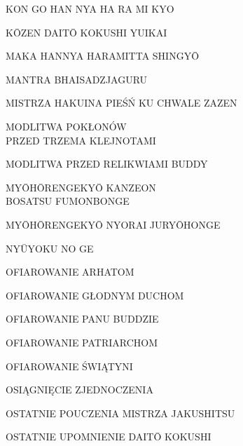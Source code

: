 \par\noindent KON GO HAN NYA HA RA MI KYO \dotfill \makebox[1.0cm][r]{\pageref{kon_go_han_nya_ha_ra_mi_kyo}}
\par\noindent K\=OZEN DAIT\=O KOKUSHI YUIKAI \dotfill \makebox[1.0cm][r]{\pageref{kozen_daito_kokushi_yuikai}}
\par\noindent MAKA HANNYA HARAMITTA SHINGY\=O \dotfill \makebox[1.0cm][r]{\pageref{hannya_shin_gyo}}
\par\noindent MANTRA BHAISADZJAGURU \dotfill \makebox[1.0cm][r]{\pageref{mantra_bhaisadzjaguru}}
\par\noindent MISTRZA HAKUINA PIEŚŃ KU CHWALE ZAZEN \dotfill \makebox[1.0cm][r]{\pageref{mistrza_hakuina_piesn}}
\par\noindent MODLITWA POKŁONÓW\\ PRZED TRZEMA KLEJNOTAMI \dotfill \makebox[1.0cm][r]{\pageref{trzy_skarby}}
\par\noindent MODLITWA PRZED RELIKWIAMI BUDDY \dotfill \makebox[1.0cm][r]{\pageref{przed_relikwiami}}
\par\noindent MY\=OH\=ORENGEKY\=O KANZEON\\ BOSATSU FUMONBONGE \dotfill \makebox[1.0cm][r]{\pageref{myohorengekyo_kanzeonbosatsu_fumonbonge}}
\par\noindent MY\=OH\=ORENGEKY\=O NYORAI JURY\=OHONGE \dotfill \makebox[1.0cm][r]{\pageref{myohorengekyo_nyorai_juryohonge}}
\par\noindent NY\=UYOKU NO GE \dotfill \makebox[1.0cm][r]{\pageref{nyuyoku_no_ge}}
\par\noindent OFIAROWANIE ARHATOM \dotfill \makebox[1.0cm][r]{\pageref{ofiarowanie_arhatom}}
\par\noindent OFIAROWANIE GŁODNYM DUCHOM \dotfill \makebox[1.0cm][r]{\pageref{ofiarowanie_glodnym_duchom}}
\par\noindent OFIAROWANIE PANU BUDDZIE \dotfill \makebox[1.0cm][r]{\pageref{ofiarowanie_panu_buddzie}}
\par\noindent OFIAROWANIE PATRIARCHOM \dotfill \makebox[1.0cm][r]{\pageref{ofiarowanie_patriarchom}}
\par\noindent OFIAROWANIE ŚWIĄTYNI \dotfill \makebox[1.0cm][r]{\pageref{ofiarowanie_swiatyni}}
\par\noindent OSIĄGNIĘCIE ZJEDNOCZENIA \dotfill \makebox[1.0cm][r]{\pageref{osiagniecie_zjednoczenia}}
\par\noindent OSTATNIE POUCZENIA MISTRZA JAKUSHITSU \dotfill \makebox[1.0cm][r]{\pageref{ostatnie_pouczenia_mistrza_jakushitsu}}
\par\noindent OSTATNIE UPOMNIENIE DAIT\=O KOKUSHI \dotfill \makebox[1.0cm][r]{\pageref{ostatnie_upomnienie}}
